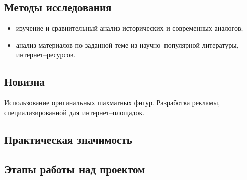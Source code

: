 \subsection*{Методы исследования}
\begin{itemize}
    \item изучение и сравнительный анализ исторических и современных аналогов;
    \item анализ материалов по заданной теме из научно--популярной литературы,
        интернет--ресурсов.
\end{itemize}

\subsection*{Новизна}
Использование оригинальных шахматных фигур. Разработка рекламы,
специализированной для интернет--площадок.

\subsection*{Практическая значимость}

\subsection*{Этапы работы над проектом}
